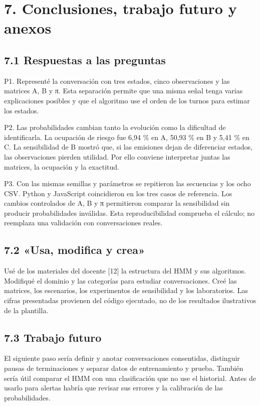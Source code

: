 \documentclass[10pt,a4paper]{article}
\begin{document}
\clearpage
\section*{7. Conclusiones, trabajo futuro y anexos}
\subsection*{7.1 Respuestas a las preguntas}
P1. Representé la conversación con tres estados, cinco observaciones y las matrices A, B y π. Esta separación permite que una misma señal tenga varias explicaciones posibles y que el algoritmo use el orden de los turnos para estimar los estados.


P2. Las probabilidades cambian tanto la evolución como la dificultad de identificarla. La ocupación de riesgo fue 6,94 \% en A, 50,93 \% en B y 5,41 \% en C. La sensibilidad de B mostró que, si las emisiones dejan de diferenciar estados, las observaciones pierden utilidad. Por ello conviene interpretar juntas las matrices, la ocupación y la exactitud.


P3. Con las mismas semillas y parámetros se repitieron las secuencias y los ocho CSV. Python y JavaScript coincidieron en los tres casos de referencia. Los cambios controlados de A, B y π permitieron comparar la sensibilidad sin producir probabilidades inválidas. Esta reproducibilidad comprueba el cálculo; no reemplaza una validación con conversaciones reales.


\subsection*{7.2 «Usa, modifica y crea»}
Usé de los materiales del docente [12] la estructura del HMM y sus algoritmos. Modifiqué el dominio y las categorías para estudiar conversaciones. Creé las matrices, los escenarios, los experimentos de sensibilidad y los laboratorios. Las cifras presentadas provienen del código ejecutado, no de los resultados ilustrativos de la plantilla.


\subsection*{7.3 Trabajo futuro}
El siguiente paso sería definir y anotar conversaciones consentidas, distinguir pausas de terminaciones y separar datos de entrenamiento y prueba. También sería útil comparar el HMM con una clasificación que no use el historial. Antes de usarlo para alertas habría que revisar sus errores y la calibración de las probabilidades.
\end{document}
